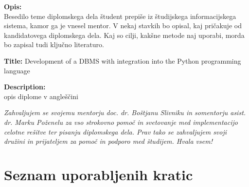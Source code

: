 \documentclass[a4paper,12pt,openright]{book}
\newcommand{\ttitleEn}{Development of a DBMS with integration into the Python programming language}
\newcommand{\clearemptydoublepage}{\newpage{\pagestyle{empty}\cleardoublepage}}
\begin{document}
\bigskip
\noindent\textbf{Opis:}\\
Besedilo teme diplomskega dela študent prepiše iz študijskega informacijskega sistema, kamor ga je vnesel mentor. 
V nekaj stavkih bo opisal, kaj pričakuje od kandidatovega diplomskega dela. 
Kaj so cilji, kakšne metode naj uporabi, morda bo zapisal tudi ključno literaturo.

\bigskip
\noindent\textbf{Title:} \ttitleEn

\bigskip
\noindent\textbf{Description:}\\
opis diplome v angleščini

\vfill



\vspace{2cm}

\clearemptydoublepage

\thispagestyle{empty}\mbox{}\vfill\null\it%
\noindent
Zahvaljujem se svojemu mentorju doc. dr. Boštjanu Slivniku in somentorju asist. dr. Marku Poženelu za vso strokovno pomoč in svetovanje med implementacijo celotne rešitve ter pisanju diplomskega dela. Prav tako se zahvaljujem svoji družini in prijateljem za pomoč in podporo med študijem.
\noindent
Hvala vsem!
\rm\normalfont

\clearemptydoublepage


\clearemptydoublepage


\setcounter{tocdepth}{2}
\pagestyle{empty}
\def\thepage{}%
\tableofcontents{}


\clearemptydoublepage


\chapter*{Seznam uporabljenih kratic}
\end{document}
